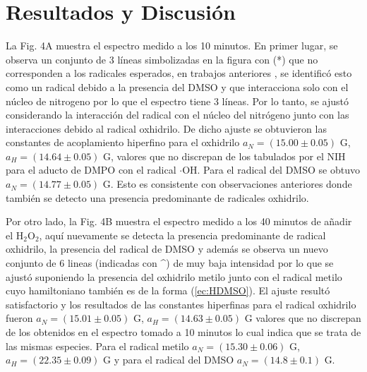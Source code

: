 \documentclass[aps,prl,reprint,superscriptaddress,showkeys]{revtex4-2}
\begin{document}
\section{Resultados y Discusión}

La Fig. 4A muestra el espectro medido a los 10 minutos. En primer lugar, se observa un conjunto de 3 líneas simbolizadas en la figura con (*) que no corresponden a los radicales esperados, en trabajos anteriores \cite{maldonado_actividad_nodate}, se identificó esto como un radical debido a la presencia del DMSO y que interacciona solo con el núcleo de nitrogeno por lo que el espectro tiene 3 líneas. Por lo tanto, se ajustó considerando la interacción del radical con el núcleo del nitrógeno junto con las interacciones debido al radical oxhidrilo. De dicho ajuste se obtuvieron las constantes de acoplamiento hiperfino para el oxhidrilo $a_N = (15.00 \pm 0.05)$ G, $a_H =  (14.64 \pm 0.05)$ G, valores que no discrepan de los tabulados por el NIH para el aducto de DMPO con el radical $\cdot$OH. Para el radical del DMSO se obtuvo $a_N = (14.77 \pm 0.05)$ G. Esto es consistente con observaciones \cite{maldonado_actividad_nodate} anteriores donde también se detecto una presencia predominante de radicales oxhidrilo. 


Por otro lado, la Fig. 4B muestra el espectro medido a los 40 minutos de añadir el H$_2$O$_2$, aquí nuevamente se detecta la presencia predominante de radical oxhidrilo, la presencia del radical de DMSO y además se observa un nuevo conjunto de 6 lineas (indicadas con \^{}) de muy baja intensidad por lo que se ajustó suponiendo la presencia  del oxhidrilo metilo junto con el radical metilo cuyo hamiltoniano también es de la forma (\ref*{ec:HDMSO}). El ajuste resultó satisfactorio y los resultados de las constantes hiperfinas para el radical oxhidrilo fueron $a_N = (15.01 \pm 0.05)$ G, $a_H = (14.63 \pm 0.05)$ G valores que no discrepan de los obtenidos en el espectro tomado a 10 minutos lo cual indica que se trata de las mismas especies. Para el radical metilo $a_N = (15.30 \pm 0.06)$ G, $a_H = (22.35 \pm 0.09)$ G y para el radical del DMSO   $a_N = (14.8 \pm 0.1)$ G. 
\end{document}
